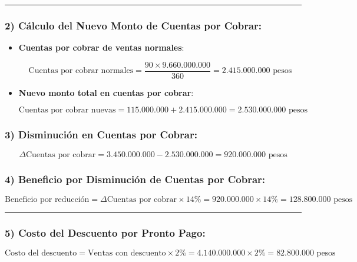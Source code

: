 \documentclass[
  letterpaper,
  DIV=11,
  numbers=noendperiod]{scrartcl}
\begin{document}
\begin{center}\rule{0.5\linewidth}{0.5pt}\end{center}

\subsubsection{2) Cálculo del Nuevo Monto de Cuentas por
Cobrar:}\label{cuxe1lculo-del-nuevo-monto-de-cuentas-por-cobrar-1}

\begin{itemize}
\item
  \textbf{Cuentas por cobrar de ventas normales}:

  \[
  \text{Cuentas por cobrar normales} = \frac{90 \times 9.660.000.000}{360} = 2.415.000.000 \text{ pesos}
  \]
\item
  \textbf{Nuevo monto total en cuentas por cobrar}:

  \[
  \text{Cuentas por cobrar nuevas} = 115.000.000 + 2.415.000.000 = 2.530.000.000 \text{ pesos}
  \]
\end{itemize}

\subsubsection{3) Disminución en Cuentas por
Cobrar:}\label{disminuciuxf3n-en-cuentas-por-cobrar}

\[
\Delta \text{Cuentas por cobrar} = 3.450.000.000 - 2.530.000.000 = 920.000.000 \text{ pesos}
\]

\subsubsection{4) Beneficio por Disminución de Cuentas por
Cobrar:}\label{beneficio-por-disminuciuxf3n-de-cuentas-por-cobrar}

\[
\text{Beneficio por reducción} = \Delta \text{Cuentas por cobrar} \times 14\% = 920.000.000 \times 14\% = 128.800.000 \text{ pesos}
\]

\begin{center}\rule{0.5\linewidth}{0.5pt}\end{center}

\subsubsection{5) Costo del Descuento por Pronto
Pago:}\label{costo-del-descuento-por-pronto-pago}

\[
\text{Costo del descuento} = \text{Ventas con descuento} \times 2\% = 4.140.000.000 \times 2\% = 82.800.000 \text{ pesos}
\]
\end{document}
